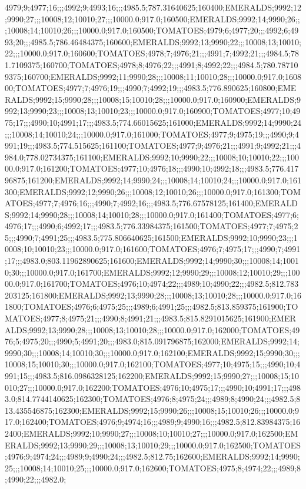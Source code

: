 4979;9;4977;16;;;4992;9;4993;16;;;4985.5;787.31640625;160400;EMERALDS;9992;12;9990;27;;;10008;12;10010;27;;;10000.0;917.0;160500;EMERALDS;9992;14;9990;26;;;10008;14;10010;26;;;10000.0;917.0;160500;TOMATOES;4979;6;4977;20;;;4992;6;4993;20;;;4985.5;786.46484375;160600;EMERALDS;9992;13;9990;22;;;10008;13;10010;22;;;10000.0;917.0;160600;TOMATOES;4978;7;4976;21;;;4991;7;4992;21;;;4984.5;781.7109375;160700;TOMATOES;4978;8;4976;22;;;4991;8;4992;22;;;4984.5;780.787109375;160700;EMERALDS;9992;11;9990;28;;;10008;11;10010;28;;;10000.0;917.0;160800;TOMATOES;4977;7;4976;19;;;4990;7;4992;19;;;4983.5;776.890625;160800;EMERALDS;9992;15;9990;28;;;10008;15;10010;28;;;10000.0;917.0;160900;EMERALDS;9992;13;9990;23;;;10008;13;10010;23;;;10000.0;917.0;160900;TOMATOES;4977;10;4975;17;;;4990;10;4991;17;;;4983.5;774.66015625;161000;EMERALDS;9992;14;9990;24;;;10008;14;10010;24;;;10000.0;917.0;161000;TOMATOES;4977;9;4975;19;;;4990;9;4991;19;;;4983.5;774.515625;161100;TOMATOES;4977;9;4976;21;;;4991;9;4992;21;;;4984.0;778.02734375;161100;EMERALDS;9992;10;9990;22;;;10008;10;10010;22;;;10000.0;917.0;161200;TOMATOES;4977;10;4976;18;;;4990;10;4992;18;;;4983.5;776.41796875;161200;EMERALDS;9992;14;9990;24;;;10008;14;10010;24;;;10000.0;917.0;161300;EMERALDS;9992;12;9990;26;;;10008;12;10010;26;;;10000.0;917.0;161300;TOMATOES;4977;7;4976;16;;;4990;7;4992;16;;;4983.5;776.67578125;161400;EMERALDS;9992;14;9990;28;;;10008;14;10010;28;;;10000.0;917.0;161400;TOMATOES;4977;6;4976;17;;;4990;6;4992;17;;;4983.5;776.33984375;161500;TOMATOES;4977;7;4975;25;;;4990;7;4991;25;;;4983.5;775.806640625;161500;EMERALDS;9992;10;9990;23;;;10008;10;10010;23;;;10000.0;917.0;161600;TOMATOES;4976;7;4975;17;;;4990;7;4991;17;;;4983.0;803.11962890625;161600;EMERALDS;9992;14;9990;30;;;10008;14;10010;30;;;10000.0;917.0;161700;EMERALDS;9992;12;9990;29;;;10008;12;10010;29;;;10000.0;917.0;161700;TOMATOES;4976;10;4974;22;;;4989;10;4990;22;;;4982.5;812.783203125;161800;EMERALDS;9992;13;9990;28;;;10008;13;10010;28;;;10000.0;917.0;161800;TOMATOES;4976;6;4975;25;;;4989;6;4991;25;;;4982.5;813.859375;161900;TOMATOES;4977;8;4975;21;;;4990;8;4991;21;;;4983.5;815.8291015625;161900;EMERALDS;9992;13;9990;28;;;10008;13;10010;28;;;10000.0;917.0;162000;TOMATOES;4976;5;4975;20;;;4990;5;4991;20;;;4983.0;815.091796875;162000;EMERALDS;9992;14;9990;30;;;10008;14;10010;30;;;10000.0;917.0;162100;EMERALDS;9992;15;9990;30;;;10008;15;10010;30;;;10000.0;917.0;162100;TOMATOES;4977;10;4975;15;;;4990;10;4991;15;;;4983.5;816.0986328125;162200;EMERALDS;9992;15;9990;27;;;10008;15;10010;27;;;10000.0;917.0;162200;TOMATOES;4976;10;4975;17;;;4990;10;4991;17;;;4983.0;814.7744140625;162300;TOMATOES;4976;8;4975;24;;;4989;8;4990;24;;;4982.5;813.435546875;162300;EMERALDS;9992;15;9990;26;;;10008;15;10010;26;;;10000.0;917.0;162400;TOMATOES;4976;9;4974;16;;;4989;9;4990;16;;;4982.5;812.83984375;162400;EMERALDS;9992;10;9990;27;;;10008;10;10010;27;;;10000.0;917.0;162500;EMERALDS;9992;13;9990;29;;;10008;13;10010;29;;;10000.0;917.0;162500;TOMATOES;4976;9;4974;24;;;4989;9;4990;24;;;4982.5;812.75;162600;EMERALDS;9992;14;9990;25;;;10008;14;10010;25;;;10000.0;917.0;162600;TOMATOES;4975;8;4974;22;;;4989;8;4990;22;;;4982.0;